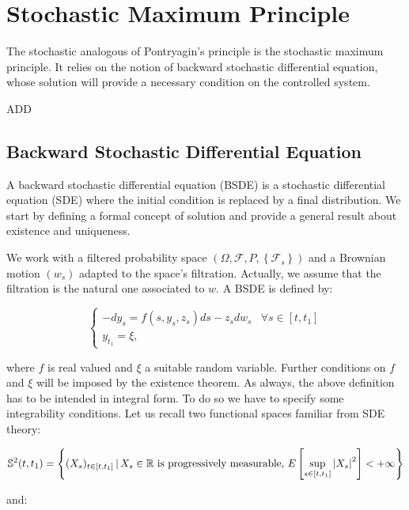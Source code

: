 \section{Stochastic Maximum Principle}

The stochastic analogous of Pontryagin's principle is the stochastic maximum principle. It relies on the notion of 
backward stochastic differential equation, whose solution will provide a necessary condition on the controlled system. 

{\color{red}{} ADD}

\subsection{Backward Stochastic Differential Equation}

A backward stochastic differential equation (BSDE) is a stochastic differential equation (SDE) where the initial condition is replaced by a final distribution. We 
start by defining a formal concept of solution and provide a general result about existence and uniqueness. 

We work with a filtered probability space $(\Omega,\mathcal{F}, P, \left\{\mathcal{F}_s\right\})$ and a Brownian motion $(w_s)$ adapted 
to the space's filtration. Actually, we assume that the filtration is the natural one associated to $w$. A BSDE is defined by:

\begin{equation}\label{2-3-defBSDE}
    \begin{cases}
        - dy_s = f(s,y_s,z_s)ds - z_sdw_s & \forall s\in[t,t_1]\\
        y_{t_1} = \xi, 
    \end{cases}
\end{equation}

where $f$ is real valued and $\xi$ a suitable random variable. Further conditions on $f$ and $\xi$ will be imposed 
by the existence theorem. As always, the above definition has to be intended in integral form. To do so we have to specify some integrability conditions. Let us recall two functional spaces familiar from SDE theory:

\begin{equation}\label{2-3-defS}
    \mathbb{S}^2(t,t_1) = \left\{(X_s)_{t\in[t,t_1]}\,|\, X_s\in\mathbb{R} \text{ is progressively measurable},\, E\left[\sup_{s\in[t,t_1]}\abs{X_s}^2\right]<+\infty\right\}
\end{equation}

and:

